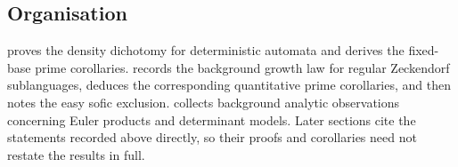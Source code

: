 \subsection{Organisation}

 proves the density dichotomy for deterministic
automata and derives the fixed-base prime corollaries.
 records the background growth law for regular
Zeckendorf sublanguages, deduces the corresponding quantitative prime
corollaries, and then notes the easy sofic exclusion.
 collects background analytic observations
concerning Euler products and determinant models. Later sections cite
the statements recorded above directly, so their proofs and corollaries
need not restate the results in full.

